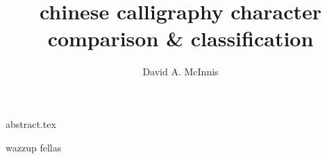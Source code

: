 \documentclass{ewuthesis}
\begin{document}
    \title{chinese calligraphy character comparison & classification}
    \author{David A. McInnis}    
    \frontmatter
    \maketitle          %
    \makesigpage        %
    {abstract.tex}
    \mainmatter



wazzup\cite{Gao:2012:CDC:2232817.2232889} fellas



    
    
    
\end{document}
